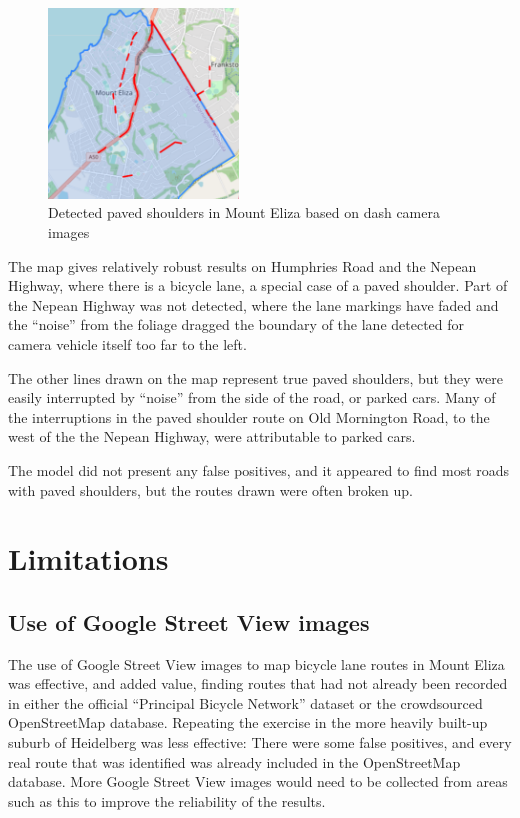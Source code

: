 \documentclass[11pt,twoside]{report}
\begin{document}
\begin{figure}[h]
\centering
\includegraphics[width=0.45\textwidth]{map3_1.png}
\caption{Detected paved shoulders in Mount Eliza based on dash camera images}
\label{fig:rq4}
\end{figure}

The map gives relatively robust results on Humphries Road and the Nepean Highway, where there is a bicycle lane, a special case of a paved shoulder.  Part of the Nepean Highway was not detected, where the lane markings have faded and the ``noise'' from the foliage dragged the boundary of the lane detected for camera vehicle itself too far to the left.

The other lines drawn on the map represent true paved shoulders, but they were easily interrupted by ``noise'' from the side of the road, or parked cars.  Many of the interruptions in the paved shoulder route on Old Mornington Road, to the west of the the Nepean Highway, were attributable to parked cars.

The model did not present any false positives, and it appeared to find most roads with paved shoulders, but the routes drawn were often broken up.



\section{Limitations}
\label{results:discussion}

\subsection{Use of Google Street View images}

The use of Google Street View images to map bicycle lane routes in Mount Eliza was effective, and added value, finding routes that had not already been recorded in either the official ``Principal Bicycle Network'' dataset or the crowdsourced OpenStreetMap database.  Repeating the exercise in the more heavily built-up suburb of Heidelberg was less effective:  There were some false positives, and every real route that was identified was already included in the OpenStreetMap database.  More Google Street View images would need to be collected from areas such as this to improve the reliability of the results.
\end{document}
